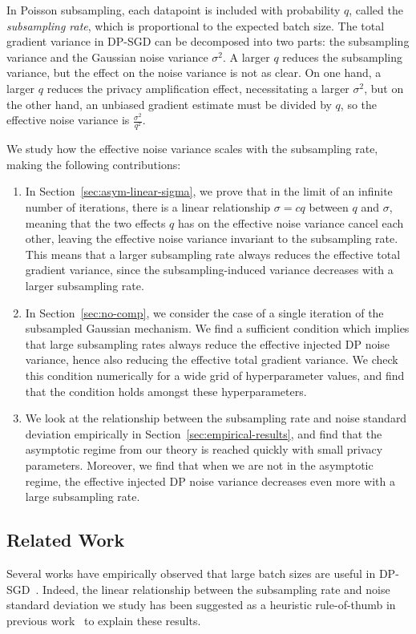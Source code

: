 \documentclass{article}
\theoremstyle{plain}
\theoremstyle{definition}
\theoremstyle{remark}
\begin{document}
In Poisson subsampling, each datapoint is included with probability $q$, called
the \emph{subsampling rate}, which is proportional to the expected batch size.
The total gradient variance in DP-SGD can be decomposed into two parts: the
subsampling variance and the Gaussian noise variance $\sigma^2$. A larger $q$
reduces the subsampling variance, but the effect on the noise variance is not as
clear. On one hand, a larger $q$ reduces the privacy amplification effect,
necessitating a larger $\sigma^2$, but on the other hand, an unbiased gradient
estimate must be divided by $q$, so the effective noise variance is
$\frac{\sigma^2}{q^2}$.

We study how the effective noise variance scales with the subsampling rate, making 
the following contributions:
\begin{enumerate}
    \item 
    In Section~\ref{sec:asym-linear-sigma}, we prove that in  the limit of an infinite number of iterations, there is a linear relationship 
    $\sigma = cq$ between $q$ and $\sigma$, meaning that the two effects $q$ has on
    the effective noise variance cancel each other, leaving the effective noise variance 
    invariant to the subsampling rate. This 
    means that a larger subsampling  rate always reduces the effective total gradient variance, since
    the subsampling-induced variance decreases with a larger subsampling rate.
    \item In Section~\ref{sec:no-comp}, we consider the case of a single iteration of 
    the subsampled Gaussian mechanism. We find a sufficient condition which implies 
    that large subsampling rates always reduce the effective injected DP noise variance, 
    hence also reducing the effective total gradient variance. We check this 
    condition numerically for a wide grid of hyperparameter values, and find that 
    the condition holds amongst these hyperparameters.
    \item We look at the relationship between the subsampling rate and noise standard deviation 
    empirically in Section~\ref{sec:empirical-results}, and find that the asymptotic regime 
    from our theory is reached quickly with small privacy parameters. Moreover, we find 
    that when we are not in the asymptotic regime, the effective injected DP noise variance decreases 
    even more with a large subsampling rate.
\end{enumerate}

\subsection{Related Work}\label{sec:related-work}
Several works have empirically observed that large batch sizes are useful in 
DP-SGD~\citep{mcmahanLearningDifferentiallyPrivate2018,deUnlocking2022,mehtaLargeScaleTransfer2023}.
Indeed, the linear relationship between the subsampling rate and noise standard deviation we 
study has been suggested as a heuristic rule-of-thumb in previous 
work~\citep{liLargeLanguageModels2021,sanderTANBurnScaling2023} to explain these results.
\end{document}
